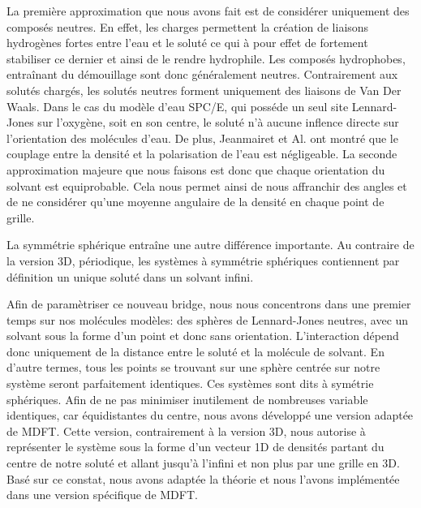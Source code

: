 La première approximation que nous avons fait est de considérer uniquement des composés neutres.
En effet, les charges permettent la création de liaisons hydrogènes fortes entre l'eau et le soluté ce qui à pour effet de fortement stabiliser ce dernier et ainsi de le rendre hydrophile.
Les composés hydrophobes, entraînant du démouillage sont donc généralement neutres.
Contrairement aux solutés chargés, les solutés neutres forment uniquement des liaisons de Van Der Waals.
Dans le cas du modèle d'eau SPC/E, qui posséde un seul site Lennard-Jones sur l'oxygène, soit en son centre, le soluté n'à aucune inflence directe sur l'orientation des molécules d'eau.
De plus, Jeanmairet et Al.\cite{jeanmairet_molecular_2013, jeanmairet_molecular_2016} ont montré que le couplage entre la densité et la polarisation de l'eau est négligeable.
La seconde approximation majeure que nous faisons est donc que chaque orientation du solvant est equiprobable. Cela nous permet ainsi de nous affranchir des angles et de ne considérer qu'une moyenne angulaire de la densité en chaque point de grille.

La symmétrie sphérique entraîne une autre différence importante. Au contraire de la version 3D, périodique, les systèmes à symmétrie sphériques contiennent par définition un unique soluté dans un solvant infini.

Afin de paramètriser ce nouveau bridge, nous nous concentrons dans une premier temps sur nos molécules modèles: des sphères de Lennard-Jones neutres, avec un solvant sous la forme d'un point et donc sans orientation. L’interaction dépend donc uniquement de la distance entre le soluté et la molécule de solvant. En d'autre termes, tous les points se trouvant sur une sphère centrée sur notre système seront parfaitement identiques. Ces systèmes sont dits à symétrie sphériques. Afin de ne pas minimiser inutilement de nombreuses variable identiques, car équidistantes du centre, nous avons développé une version adaptée de MDFT. Cette version, contrairement à la version 3D, nous autorise à représenter le système sous la forme d'un vecteur 1D de densités partant du centre de notre soluté et allant jusqu'à l'infini et non plus par une grille en 3D. Basé sur ce constat, nous avons adaptée la théorie et nous l'avons implémentée dans une version spécifique de MDFT.



